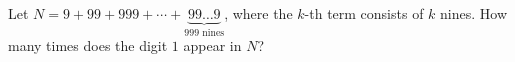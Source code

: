 Let $N=9+99+999+\cdots+\underbrace{99\ldots9}_{999\text{ nines}}$, where the $k$-th term consists of $k$ nines. How many times does the digit $1$ appear in $N$?
